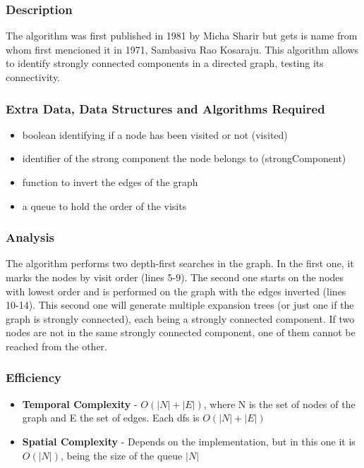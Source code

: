 \subsubsection{Description}
The algorithm was first published in 1981 by Micha Sharir but gets is name from whom first mencioned it in 1971, Sambasiva Rao Kosaraju. This algorithm allows to identify strongly connected components in a directed graph, testing its connectivity. 

\subsubsection{Extra Data, Data Structures and Algorithms Required}
\begin{itemize}
    \item boolean identifying if a node has been visited or not (visited)
    \item identifier of the strong component the node belongs to (strongComponent)
    \item function to invert the edges of the graph
    \item a queue to hold the order of the visits
\end{itemize}



\subsubsection{Analysis}
The algorithm performs two depth-first searches in the graph. In the first one, it marks the nodes by visit order (lines 5-9). The second one starts on the nodes with lowest order and is performed on the graph with the edges inverted (lines 10-14). This second one will generate multiple expansion trees (or just one if the graph is strongly connected), each being a strongly connected component. If two nodes are not in the same strongly connected component, one of them cannot be reached from the other.

\subsubsection{Efficiency}
\begin{itemize}
    \item \textbf{Temporal Complexity} - $ O(|N|+|E|) $, where N is the set of nodes of the graph and E the set of edges. Each dfs is $O(|N|+|E|)$
    \item \textbf{Spatial Complexity} - Depends on the implementation, but in this one it is $ O(|N|) $, being the size of the queue $|N|$
\end{itemize}

